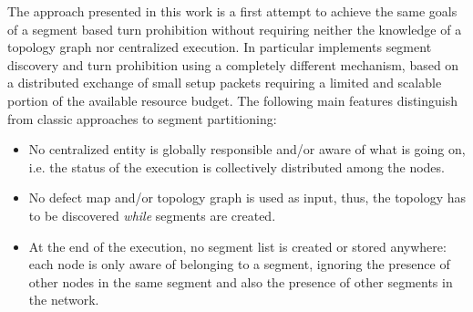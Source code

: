 The \disr{} approach presented in this work is a first attempt to
achieve the same goals of a segment based turn prohibition without
requiring neither the knowledge of a topology graph nor centralized execution. In particular
\disr{} implements segment discovery and turn prohibition using a
completely different mechanism, based on a distributed exchange of
small setup packets requiring a limited and scalable portion of the available
resource budget. The following main features distinguish \disr{}
from classic approaches to segment partitioning: 
\begin{itemize}
\item No centralized entity is globally responsible and/or aware of
what is going on, i.e. the status of the \disr{} execution is
collectively distributed among the nodes.
\item  No defect map and/or topology graph is used as input,
thus, the topology has to be discovered \emph{while} segments are
created.
\item At the end of the execution, no segment list is created or
stored anywhere: each node is only aware of belonging to a segment,
ignoring the presence of other nodes in the same segment and also the
presence of other segments in the network.
\end{itemize}


